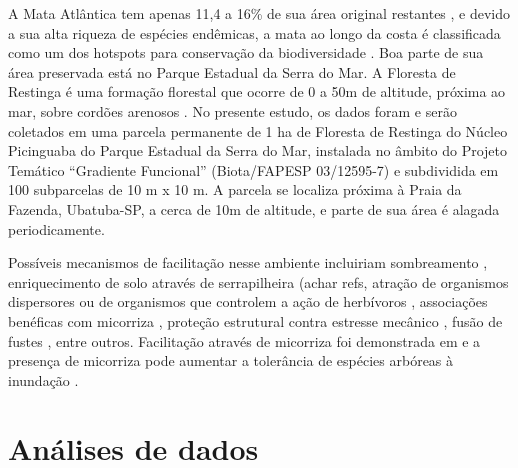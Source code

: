 \documentclass[twoside,12pt,a4paper]{report}
\begin{document}
A Mata Atlântica tem apenas 11,4 a 16\% de sua área original restantes \citep{Ribeiro2009}, e
devido a sua alta riqueza de espécies endêmicas, a mata ao longo da costa é classificada como um dos
hotspots para conservação da biodiversidade \citep{Myers2000}. Boa parte de sua área preservada
está no Parque Estadual da Serra do Mar. A Floresta de Restinga é uma formação florestal que ocorre
de 0 a 50m de altitude, próxima ao mar, sobre cordões arenosos \citep{Joly2008}. No presente
estudo, os dados foram e serão coletados em uma parcela permanente de 1 ha de Floresta de Restinga
do Núcleo Picinguaba do Parque Estadual da Serra do Mar, instalada no âmbito do Projeto Temático
“Gradiente Funcional” (Biota/FAPESP 03/12595-7) e subdividida em 100 subparcelas de 10 m x 10 m. A
parcela se localiza próxima à Praia da Fazenda, Ubatuba-SP, a cerca de 10m de altitude, e parte de
sua área é alagada periodicamente.

Possíveis mecanismos de facilitação nesse ambiente incluiriam sombreamento
\citep{Castanho2014, etc}, enriquecimento de solo através de serrapilheira (achar refs, atração de
organismos dispersores \citep{achar refs CallawayBook} ou de organismos que controlem a ação de
herbívoros \citep{refs}, associações benéficas com micorriza \citep{Simard1997}, proteção
estrutural contra estresse mecânico \citep{refs}, fusão de fustes \citep{McIntire2011}, entre
outros. Facilitação através de micorriza foi demonstrada em \citep{Simard1997} e a presença de
micorriza pode aumentar a tolerância de espécies arbóreas à inundação \citep{Fougnies2007}. 

\section{Análises de dados}
\end{document}
